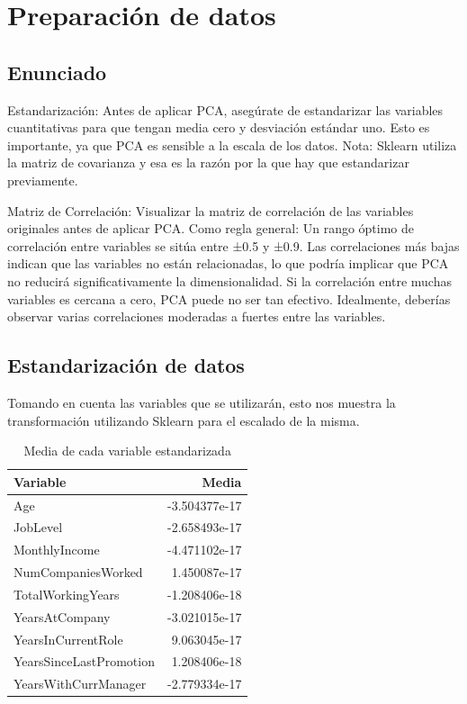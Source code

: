 \newpage
\section{Preparación de datos}
\subsection{Enunciado}
Estandarización: Antes de aplicar PCA, asegúrate de estandarizar las variables cuantitativas para que tengan media cero y desviación estándar uno. Esto es importante, ya que PCA es sensible a la escala de los datos. Nota: Sklearn utiliza la matriz de covarianza y esa es la razón por la que hay que estandarizar previamente. 

Matriz de Correlación: Visualizar la matriz de correlación de las variables originales antes de aplicar PCA. Como regla general:
Un rango óptimo de correlación entre variables se sitúa entre ±0.5 y ±0.9. Las correlaciones más bajas indican que las variables no están relacionadas, lo que podría implicar que PCA no reducirá significativamente la dimensionalidad. Si la correlación entre muchas variables es cercana a cero, PCA puede no ser tan efectivo. Idealmente, deberías observar varias correlaciones moderadas a fuertes entre las variables.

\subsection{Estandarización de datos}
Tomando en cuenta las variables que se utilizarán, esto nos muestra la transformación utilizando Sklearn para el escalado de la misma.

\begin{table}[H]
\centering
\begin{tabular}{|l|r|}
\hline
\textbf{Variable} & \textbf{Media} \\ \hline
Age                       & -3.504377e-17 \\ \hline
JobLevel                  & -2.658493e-17 \\ \hline
MonthlyIncome             & -4.471102e-17 \\ \hline
NumCompaniesWorked         &  1.450087e-17 \\ \hline
TotalWorkingYears          & -1.208406e-18 \\ \hline
YearsAtCompany             & -3.021015e-17 \\ \hline
YearsInCurrentRole         &  9.063045e-17 \\ \hline
YearsSinceLastPromotion    &  1.208406e-18 \\ \hline
YearsWithCurrManager      & -2.779334e-17 \\ \hline
\end{tabular}
\caption{Media de cada variable estandarizada}
\end{table}

